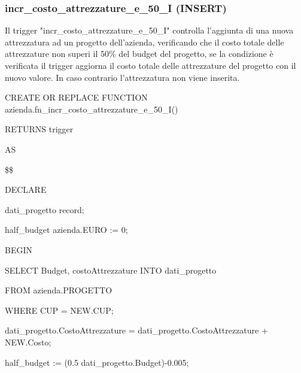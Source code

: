     \subsubsection{incr\_costo\_attrezzature\_e\_50\_I (INSERT)}
    Il trigger "incr\_costo\_attrezzature\_e\_50\_I" controlla l'aggiunta di una nuova attrezzatura ad un progetto dell'azienda, verificando che il costo totale delle attrezzature non superi il 50\% del budget del progetto, se la condizione è verificata il trigger aggiorna il costo totale delle attrezzature del progetto con il nuovo valore. In caso contrario l'attrezzatura non viene inserita.
    \ttfamily
        \begin{flushleft}
            \begin{description}
                \item CREATE OR REPLACE FUNCTION azienda.fn\_incr\_costo\_attrezzature\_e\_50\_I()  
                \item RETURNS trigger
                \item AS
                \item \$\$
                \item DECLARE
                \begin{description}
                    \item dati\_progetto record;
                    \item half\_budget azienda.EURO := 0;
                \end{description}
                \item BEGIN 
                \begin{description}
                    \item SELECT Budget, costoAttrezzature INTO dati\_progetto
                    \item FROM azienda.PROGETTO
                    \item WHERE CUP = NEW.CUP;
                    
                    \vspace{0.5cm}

                    \item dati\_progetto.CostoAttrezzature = dati\_progetto.CostoAttrezzature + NEW.Costo;
                
                    \item half\_budget := (0.5 \* dati\_progetto.Budget)-0.005;
                
                    \vspace{0.5cm}


\end{description}
\end{description}
\end{flushleft}
